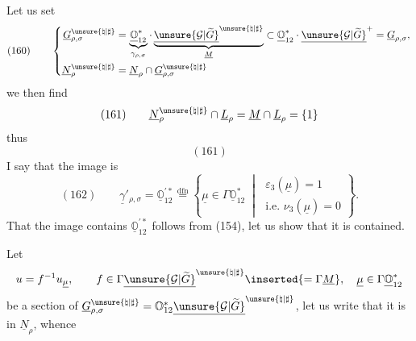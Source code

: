 Let us set
\[
(160)\qquad\left\{
\begin{aligned}
\underline G_{\rho,\sigma}^{\unsure{\natural|\sharp}}
&=\underbrace{\underline{\mathbb O}_{12}^{*}}_{\gamma_{\rho,\sigma}}\cdot
\underbrace{\underline{\unsure{\mathcal G|\widetilde G}}^{\unsure{\natural|\sharp}}}_{\underline M}
\subset\underline{\mathbb O}_{12}^{*}\cdot\underline{\unsure{\mathcal G|\widetilde G}}^{+}
=\underline G_{\rho,\sigma},\\
\underline N_\rho^{\unsure{\natural|\sharp}}
&=\underline N_\rho\cap\underline G_{\rho,\sigma}^{\unsure{\natural|\sharp}}
\end{aligned}\right.
\]
we then find
\[
(161)\qquad
\underline N_\rho^{\unsure{\natural|\sharp}}\cap\underline L_\rho
=\underline M\cap\underline L_\rho=\{1\}
\]
thus
\[
(161)
\]
I say that the image is
\[
(162)\qquad
\underline\gamma'_{\rho,\sigma}
=\underline{\mathbb O}_{12}^{\prime *}
\overset{\mathrm{dfn}}{=}
\left\{\underline\mu\in\Gamma\underline{\mathbb O}_{12}^{*}\;\middle|\;
\begin{gathered}\varepsilon_3(\underline\mu)=1\\\text{i.e. }\nu_3(\underline\mu)=0\end{gathered}\right\}.
\]
That the image contains $\underline{\mathbb O}_{12}^{\prime *}$ follows from (154), let us show that it is contained.

Let
\[
u=f^{-1}u_{\underline\mu},\qquad
f\in\Gamma\underline{\unsure{\mathcal G|\widetilde G}}^{\unsure{\natural|\sharp}}\inserted{=\Gamma\underline M},\quad
\underline\mu\in\Gamma\underline{\mathbb O}_{12}^{*}
\]
be a  section of
$\underline G_{\rho,\sigma}^{\unsure{\natural|\sharp}}
=\mathbb O_{12}^{*}\underline{\unsure{\mathcal G|\widetilde G}}^{\unsure{\natural|\sharp}}$,
let us write that it is in $\underline N_\rho$, whence


